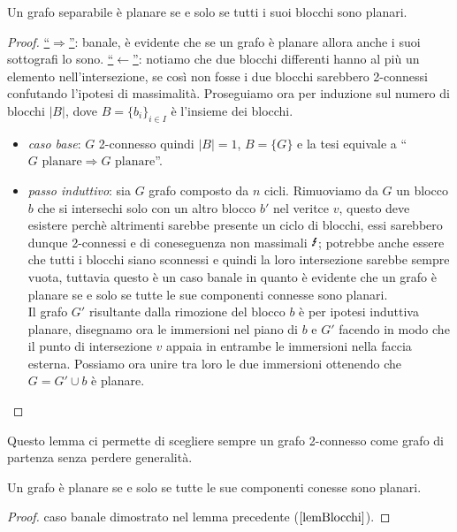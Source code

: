 \begin{lemma}\label{lemBlocchi}
    Un grafo separabile è planare se e solo se tutti i suoi blocchi sono planari.
    \begin{proof}
        \underline{“\(\Rightarrow\)”}: banale, è evidente che se un grafo è planare allora anche i suoi sottografi lo sono.
        \underline{“\(\leftarrow\)”}: notiamo che due blocchi differenti hanno al più un elemento nell'intersezione, se così non fosse i due blocchi sarebbero 2-connessi confutando l'ipotesi di massimalità. Proseguiamo ora per induzione sul numero di blocchi \(|B|\), dove \(B={\{b_i\}}_{i \in I}\) è l'insieme dei blocchi.
        \begin{itemize}
            \item \textit{caso base}: \(G\) 2-connesso quindi \(|B|=1\), \(B=\{G\}\) e la tesi equivale a “\(G \text{ planare} \Rightarrow G \text{ planare}\)”.
            \item \textit{passo induttivo}: sia \(G\) grafo composto da \(n\) cicli. Rimuoviamo da \(G\) un blocco \(b\) che si intersechi solo con un altro blocco \(b'\) nel veritce \(v\), questo deve esistere perchè altrimenti sarebbe presente un ciclo di blocchi, essi sarebbero dunque 2-connessi e di coneseguenza non massimali \(\text{\Lightning}\); 
            potrebbe anche essere che tutti i blocchi siano sconnessi e quindi la loro intersezione sarebbe sempre vuota, tuttavia questo è un caso banale in quanto è evidente che un grafo è planare se e solo se tutte le sue componenti connesse sono planari. 
            \\ Il grafo \(G'\) risultante dalla rimozione del blocco \(b\) è per ipotesi induttiva planare, disegnamo ora le immersioni nel piano di \(b\) e \(G'\) facendo in modo che il punto di intersezione \(v\) appaia in entrambe le immersioni nella faccia esterna. Possiamo ora unire tra loro le due immersioni ottenendo che \(G=G' \cup b\) è planare.
        \end{itemize}
    \end{proof}
\end{lemma}
\noindent Questo lemma ci permette di scegliere sempre un grafo 2-connesso come grafo di partenza senza perdere generalità.

\begin{lemma}
    Un grafo è planare se e solo se tutte le sue componenti conesse sono planari.
    \begin{proof}
        caso banale dimostrato nel lemma precedente (\(\ref{lemBlocchi}\)).
    \end{proof}
\end{lemma}

